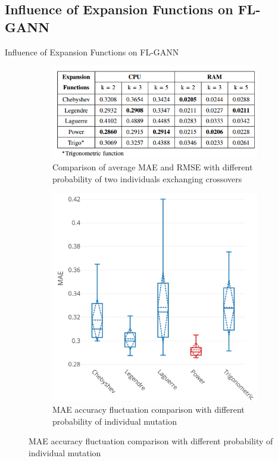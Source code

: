 \documentclass{beamer}
\newcommand{\notesize}{\fontsize{8}{10}\selectfont}
\begin{document}
\subsection{Influence of Expansion Functions on FL-GANN}

\begin{frame}{Influence of Expansion Functions on FL-GANN}
	\begin{figure}
		\centering
		\begin{subfigure}{0.6\textwidth}
			\centering
			\includegraphics[width=1.0\linewidth]{expansion_function.png}
			\caption*{\notesize Comparison of average MAE and RMSE with different probability of two individuals exchanging crossovers}
			\label{fig:sub11}
		\end{subfigure}%
		\begin{subfigure}{.4\textwidth}
			\centering
			\includegraphics[width=1.0\linewidth]{tn2_multi_cpu_function.pdf}
			\caption*{\notesize MAE accuracy fluctuation comparison with different probability of individual mutation}
			\label{fig:sub21}
		\end{subfigure}%
		\label{fig:cpu_predict}
	\end{figure}
\end{frame}
\end{document}
